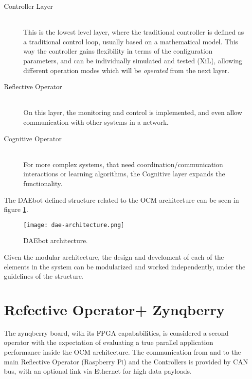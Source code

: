 \begin{description}
	\item[Controller Layer] \hfill \\ This is the lowest level layer, where the traditional controller is defined as a traditional control loop, usually based on a mathematical model. This way the controller gains flexibility in terms of the configuration parameters, and can be individually simulated and tested (XiL), allowing different operation modes which will be \textit{operated} from the next layer.
	\item[Reflective Operator] \hfill \\ On this layer, the monitoring and control is implemented, and even allow communication with other systems in a network.
	\item[Cognitive Operator] \hfill \\ For more complex systems, that need coordination/communication interactions or learning algorithms, the Cognitive layer expands the functionality.
\end{description}

The DAEbot defined structure related to the OCM architecture can be seen in figure \ref{fig:daebot}.

\begin{figure}[ht]
	\centering
	\texttt{[image: dae-architecture.png]}
	\caption{DAEbot architecture.} \label{fig:daebot}
\end{figure}

Given the modular architecture, the design and develoment of each of the elements in the system can be modularized and worked independently, under the guidelines of the structure.

\section{Refective Operator+ Zynqberry}

The zynqberry board, with its FPGA capababilities, is considered a second operator with the expectation of evaluating a true parallel application performance inside the OCM architecture. The communication from and to the main Reflective Operator (Raspberry Pi) and the Controllers is provided by CAN bus, with an optional link via Ethernet for high data payloads.
